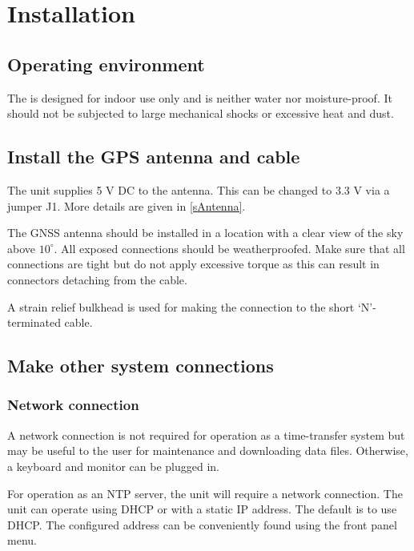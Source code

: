 
\section{Installation}

\subsection{Operating environment}

The \sysname{} is designed for indoor use only and is neither water nor moisture-proof.
It should not be subjected to large mechanical shocks or excessive heat and dust.

\subsection{Install the GPS antenna and cable}

The unit supplies 5 V DC to the antenna. This can be changed to 3.3 V via a jumper J1.
More details are given in \ref{sAntenna}.

The GNSS antenna should be installed in a location with a clear
view of the sky above $10^{\circ}$. All exposed connections should be
weatherproofed. Make sure that all connections are tight but do not apply
excessive torque as this can result in connectors detaching from the cable.

A strain relief bulkhead is  used for making the connection to the short 
`N'-terminated cable. 

\subsection{Make other system connections}


\subsubsection{Network connection}

A network connection is not required for operation as a time-transfer system
but may be useful to the user for maintenance and downloading data files. Otherwise, 
a keyboard and monitor can be plugged in.

For operation as an NTP server, the unit will require a network connection.
The unit can operate using DHCP or with
a static IP address. The default is to use DHCP. The configured address can be conveniently found using the 
front panel menu.

